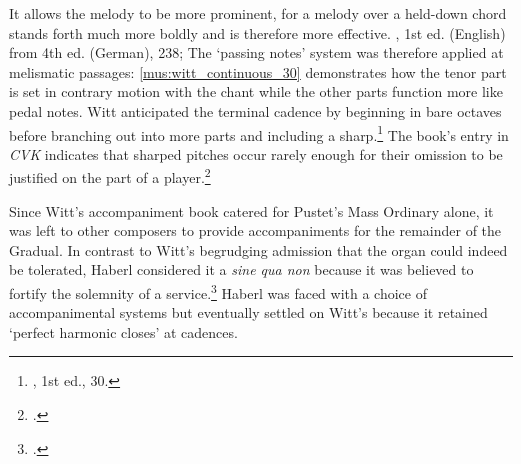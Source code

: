 \pagebreak{}

\ParallelPar
{}
\ParallelPar
{}
  {\cites[p.~v]{WittVorwortzurOrgelbegleitung1872}[See also the same preface printed separately in][52]{WittVorwortzurOrgelbegleitung1872}}
{It allows the melody to be more \linebreak{}prominent, for a melody over a held-down chord stands forth much more boldly and is therefore more effective.}
  {\cite{HaberlMagisterChoralisTheoretical1877}, 1st ed. (English) from 4th ed. (German), 238; \cite[pp.~iii--iv of the Anglophone preface]{WittOrganumcomitansad1881}}
\noindent
The `passing notes' system was therefore applied at melismatic passages: \cref{mus:witt_continuous_30} demonstrates how the tenor part is set in contrary motion with the chant while the other parts function more like pedal notes.
Witt anticipated the terminal cadence by beginning in bare octaves before branching out into more parts and including a sharp.\footnote{\cite{WittOrganumcomitansad1872}, 1st ed., 30.}
The book's entry in \emph{CVK} indicates that sharped pitches occur rarely enough for their omission to be justified on the part of a player.\footnote{.}

Since Witt's accompaniment book catered for Pustet's Mass Ordinary alone, it was left to other composers to provide accompaniments for the remainder of the Gradual.
In contrast to Witt's begrudging admission that the organ could indeed be tolerated, Haberl considered it a \emph{sine qua non} because it was believed to fortify the solemnity of a service.\footcite[134--5]{HaberlMagisterChoralisTheoretisch1864}
Haberl was faced with a choice of accompanimental systems but eventually settled on Witt's because it retained `perfect harmonic closes' at cadences.

